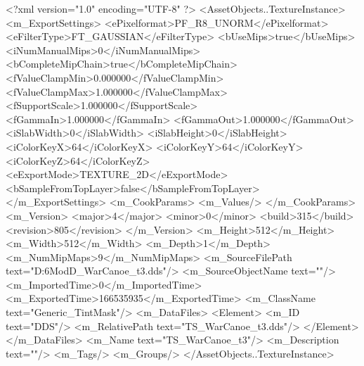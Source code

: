 <?xml version="1.0" encoding="UTF-8" ?>
<AssetObjects..TextureInstance>
	<m_ExportSettings>
		<ePixelformat>PF_R8_UNORM</ePixelformat>
		<eFilterType>FT_GAUSSIAN</eFilterType>
		<bUseMips>true</bUseMips>
		<iNumManualMips>0</iNumManualMips>
		<bCompleteMipChain>true</bCompleteMipChain>
		<fValueClampMin>0.000000</fValueClampMin>
		<fValueClampMax>1.000000</fValueClampMax>
		<fSupportScale>1.000000</fSupportScale>
		<fGammaIn>1.000000</fGammaIn>
		<fGammaOut>1.000000</fGammaOut>
		<iSlabWidth>0</iSlabWidth>
		<iSlabHeight>0</iSlabHeight>
		<iColorKeyX>64</iColorKeyX>
		<iColorKeyY>64</iColorKeyY>
		<iColorKeyZ>64</iColorKeyZ>
		<eExportMode>TEXTURE_2D</eExportMode>
		<bSampleFromTopLayer>false</bSampleFromTopLayer>
	</m_ExportSettings>
	<m_CookParams>
		<m_Values/>
	</m_CookParams>
	<m_Version>
		<major>4</major>
		<minor>0</minor>
		<build>315</build>
		<revision>805</revision>
	</m_Version>
	<m_Height>512</m_Height>
	<m_Width>512</m_Width>
	<m_Depth>1</m_Depth>
	<m_NumMipMaps>9</m_NumMipMaps>
	<m_SourceFilePath text="D:\Civ6Mod\3D\WarCanoe\TS_WarCanoe_t3.dds"/>
	<m_SourceObjectName text=""/>
	<m_ImportedTime>0</m_ImportedTime>
	<m_ExportedTime>166535935</m_ExportedTime>
	<m_ClassName text="Generic_TintMask"/>
	<m_DataFiles>
		<Element>
			<m_ID text="DDS"/>
			<m_RelativePath text="TS_WarCanoe_t3.dds"/>
		</Element>
	</m_DataFiles>
	<m_Name text="TS_WarCanoe_t3"/>
	<m_Description text=""/>
	<m_Tags/>
	<m_Groups/>
</AssetObjects..TextureInstance>

